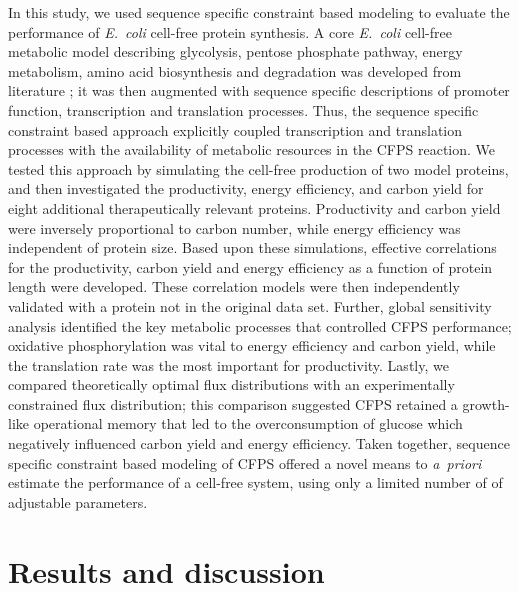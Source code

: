 \documentclass[journal=asbcd6,manuscript=article]{achemso}
\begin{document}
In this study, we used sequence specific constraint based modeling to evaluate the performance of \emph{E.~coli} cell-free protein synthesis.
A core \emph{E.~coli} cell-free metabolic model describing glycolysis, pentose phosphate pathway, energy metabolism, amino acid biosynthesis and degradation was developed from literature \cite{Feist:2007aa}; it was then augmented with sequence specific descriptions of promoter function, transcription and translation processes.
Thus, the sequence specific constraint based approach explicitly coupled transcription and translation processes with the availability of metabolic resources in the CFPS reaction.
We tested this approach by simulating the cell-free production of two model proteins, and then investigated the productivity, energy efficiency, and carbon yield for eight additional therapeutically relevant proteins.
Productivity and carbon yield were inversely proportional to carbon number, while energy efficiency was independent of protein size.
Based upon these simulations, effective correlations for the productivity, carbon yield and energy efficiency as a function of protein length were developed.
These correlation models were then independently validated with a protein not in the original data set.
Further, global sensitivity analysis identified the key metabolic processes that controlled CFPS performance;
oxidative phosphorylation was vital to energy efficiency and carbon yield, while the translation rate was the most important for productivity.
Lastly, we compared theoretically optimal flux distributions with an experimentally constrained flux distribution;
this comparison suggested CFPS retained a growth-like operational memory that led to the overconsumption of glucose which negatively influenced carbon yield and energy efficiency.
Taken together, sequence specific constraint based modeling of CFPS offered a novel means to \emph{a~priori} estimate the performance of a cell-free system, using only a limited number of
of adjustable parameters.

\clearpage

\section{Results and discussion}


\end{document}
